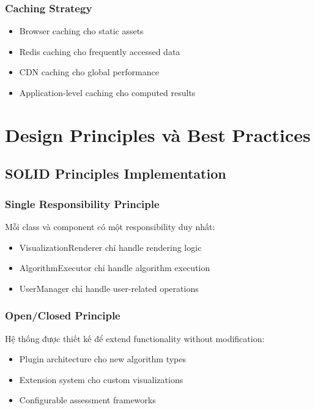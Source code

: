 \subsubsection{Caching Strategy}
\begin{itemize}
    \item Browser caching cho static assets
    \item Redis caching cho frequently accessed data
    \item CDN caching cho global performance
    \item Application-level caching cho computed results
\end{itemize}

\section{Design Principles và Best Practices}
\label{sec:design-principles}

\subsection{SOLID Principles Implementation}

\subsubsection{Single Responsibility Principle}
Mỗi class và component có một responsibility duy nhất:
\begin{itemize}
    \item VisualizationRenderer chỉ handle rendering logic
    \item AlgorithmExecutor chỉ handle algorithm execution
    \item UserManager chỉ handle user-related operations
\end{itemize}

\subsubsection{Open/Closed Principle}
Hệ thống được thiết kế để extend functionality without modification:
\begin{itemize}
    \item Plugin architecture cho new algorithm types
    \item Extension system cho custom visualizations
    \item Configurable assessment frameworks
\end{itemize}

